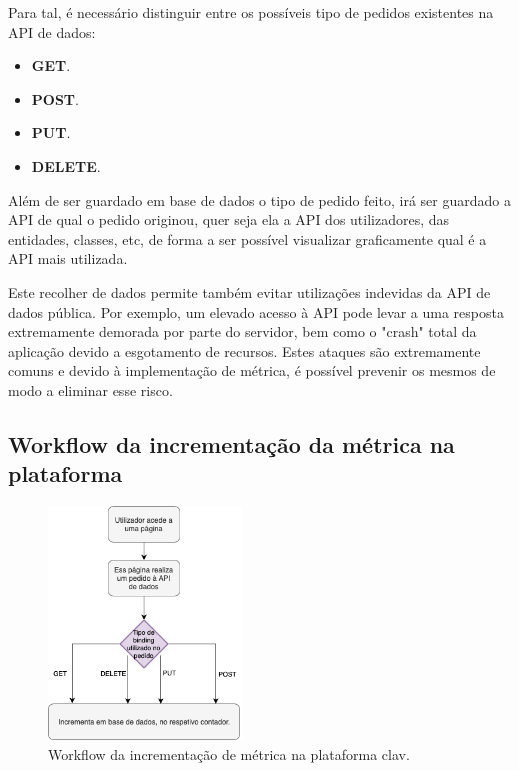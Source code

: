 Para tal, é necessário distinguir entre os possíveis tipo de pedidos existentes na API de dados: 
\vspace{-3mm}
\begin{itemize}
    \item \textbf{GET}.
    \vspace{-1.5mm}
    \item \textbf{POST}.
    \vspace{-1.5mm}
    \item \textbf{PUT}.
    \vspace{-1.5mm}
    \item \textbf{DELETE}.
\end{itemize}

\vspace{-1mm}
Além de ser guardado em base de dados o tipo de pedido feito, irá ser guardado a API de qual o pedido originou, quer seja ela a API dos utilizadores, das entidades, classes, etc, de forma a ser possível visualizar graficamente qual é a API mais utilizada.

Este recolher de dados permite também evitar utilizações indevidas da API de dados pública. Por exemplo, um elevado acesso à API pode levar a uma resposta extremamente demorada por parte do servidor, bem como o "crash" total da aplicação devido a esgotamento de recursos. Estes ataques são extremamente comuns e devido à implementação de métrica, é possível prevenir os mesmos de modo a eliminar esse risco.

\vspace{-6mm}
\subsection{Workflow da incrementação da métrica na plataforma}
\vspace{-5mm}
\begin{figure}[h!]
    \centering
    \includegraphics[width=0.46\textwidth]{img/diagramas/gestaometrica/Metrica.png}
    \caption{Workflow da incrementação de métrica na plataforma \gls{clav}.}
    \label{fig:flow_Metrica}
\end{figure}

